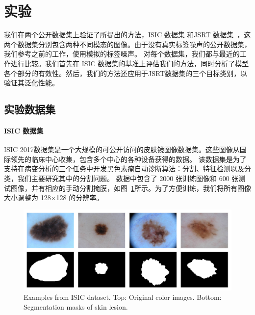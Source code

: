 \section{实验}

我们在两个公开数据集上验证了所提出的方法，ISIC 数据集\citep{Gutman2018SkinLA} 和JSRT 数据集~\citep{Shiraishi2000DevelopmentOA,Ginneken2006SegmentationOA}，这两个数据集分别包含两种不同模态的图像。由于没有真实标签噪声的公开数据集，我们参考之前的工作，使用模拟的标签噪声。
对每个数据集，我们都与最近的工作进行比较。我们首先在 ISIC 数据集的基准上评估我们的方法，同时分析了模型各个部分的有效性。然后，我们的方法还应用于JSRT数据集的三个目标类别，以验证其泛化性能。

\subsection{实验数据集}
\paragraph{ISIC 数据集}
ISIC 2017数据集\citep{Gutman2018SkinLA}是一个大规模的可公开访问的皮肤镜图像数据集。这些图像从国际领先的临床中心收集，包含多个中心的各种设备获得的数据。
该数据集是为了支持在病变分析的三个任务中开发黑色素瘤自动诊断算法：分割、特征检测以及分类，我们主要研究其中的分割问题。
数据中包含了 2000 张训练图像和 600 张测试图像，并有相应的手动分割掩膜，如图~\ref{fig:isic_intro}所示。为了方便训练，我们将所有图像大小调整为 128$\times$128 的分辨率。
    \begin{figure}[tbp]
        \centering 
        \includegraphics[width=1.0\textwidth]{img/c4/c_isic.png}
        {Examples from ISIC dataset. Top: Original color images. Bottom: Segmentation masks of skin lesion.}
        \label{fig:isic_intro}
    \end{figure}


